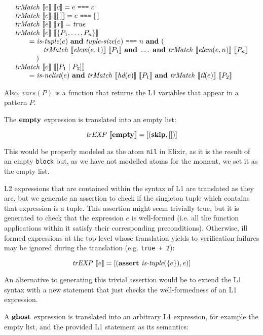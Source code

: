 \[
\begin{array}{l}
\mathit{trMatch}~\llbracket e\rrbracket~\llbracket c\rrbracket = e~\texttt{===}~{c}\\
\mathit{trMatch}~\llbracket e\rrbracket~\llbracket[\:]\rrbracket = e~\texttt{===}~{[\:]} \\
\mathit{trMatch}~\llbracket e\rrbracket~\llbracket x\rrbracket = \mathit{true}\\
\mathit{trMatch}~\llbracket e\rrbracket~\llbracket\{P_1,\ldots,P_n\}\rrbracket\\
\qquad = \textit{is-tuple}(e)~\mathbf{and}~\textit{tuple-size}(e)~\texttt{===}~n~\mathbf{and}~(\\
\qquad\quad\quad\mathit{trMatch}~\llbracket\textit{elem}(e, 1)\rrbracket~\llbracket P_1\rrbracket~\mathbf{and}~\dots~\mathbf{and}~\mathit{trMatch}~\llbracket\textit{elem}(e, n)\rrbracket~\llbracket P_n\rrbracket\\
\qquad\quad)\\
\mathit{trMatch}~\llbracket e\rrbracket~\llbracket[P_1\mid P_2]\rrbracket\\
\qquad = \textit{is-nelist}(e)~\mathbf{and}~\mathit{trMatch}~\llbracket\textit{hd}(e)\rrbracket~\llbracket P_1\rrbracket~\mathbf{and}~\mathit{trMatch}~\llbracket\textit{tl}(e)\rrbracket~\llbracket P_2\rrbracket
\end{array}
\]

Also, $\mathit{vars}(P)$ is a function that returns the L1 variables that appear
in a pattern $P$.

The $\textbf{empty}$ expression is translated into an empty list:

\[
\mathit{trEXP}~\llbracket\textbf{empty}\rrbracket = [(\textbf{skip}, [])]
\]

This would be properly modeled as the atom \verb|nil| in Elixir, as it is the
result of an empty \verb|block| but, as we have not modelled atoms for the
moment, we set it as the empty list.

L2 expressions that are contained within the syntax of L1 are translated as they
are, but we generate an assertion to check if the singleton tuple which contains
that expression is a tuple. This assertion might seem trivially true, but it is 
generated to check that the expression $e$ is well-formed (i.e. all the function
applications within it satisfy their corresponding preconditions). Otherwise,
ill formed expressions at the top level whose translation yields to verification
failures may be ignored during the translation (e.g. \verb|true + 2|):

\[
\mathit{trEXP}~\llbracket e\rrbracket = [(\textbf{assert}~\textit{is\mbox{-}tuple}(\{e\}), e)]
\]

An alternative to generating this trivial assertion would be to extend the L1
syntax with a new statement that just checks the well-formedness of an L1
expression.

A $\textbf{ghost}$ expression is translated into an arbitrary L1 expression, for
example the empty list, and the provided L1 statement as its semantics:

